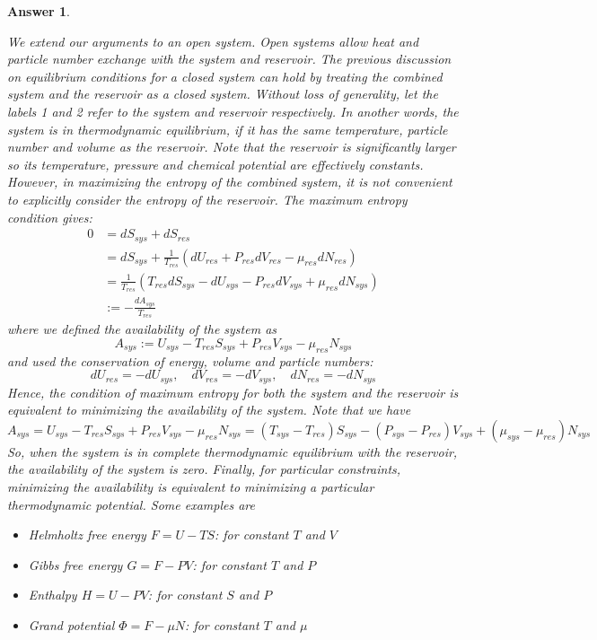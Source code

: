 \documentclass[a4paper]{article}
\newtheorem{ans}{Answer}[section]
\theoremstyle{new}
\begin{document}
\begin{ans}
\begin{itemize}
\end{itemize}
We extend our arguments to an open system. Open systems allow heat and particle number exchange with the system and reservoir. The previous discussion on equilibrium conditions for a closed system can hold by treating the combined system and the reservoir as a closed system. Without loss of generality, let the labels 1 and 2 refer to the system and reservoir respectively. In another words, the system is in thermodynamic equilibrium, if it has the same temperature, particle number and volume as the reservoir. Note that the reservoir is significantly larger so its temperature, pressure and chemical potential are effectively constants.\\[5pt]
However, in maximizing the entropy of the combined system, it is not convenient to explicitly consider the entropy of the reservoir. The maximum entropy condition gives:
\begin{align}
    0&=dS_{sys}+dS_{res}\nonumber\\&=dS_{sys}+\frac{1}{T_{res}}(dU_{res}+P_{res}dV_{res}-\mu_{res}dN_{res})\nonumber\\&=\frac{1}{T_{res}}(T_{res}dS_{sys}-dU_{sys}-P_{res}dV_{sys}+\mu_{res}dN_{sys})\nonumber\\&:=-\frac{dA_{sys}}{T_{res}}\nonumber
\end{align}
where we defined the availability of the system as
$$A_{sys}:=U_{sys}-T_{res}S_{sys}+P_{res}V_{sys}-\mu_{res}N_{sys}$$
and used the conservation of energy, volume and particle numbers:
$$dU_{res}=-dU_{sys},\quad dV_{res}=-dV_{sys},\quad dN_{res}=-dN_{sys}$$
Hence, the condition of maximum entropy for both the system and the reservoir is equivalent to minimizing the availability of the system. Note that we have
$$A_{sys}=U_{sys}-T_{res}S_{sys}+P_{res}V_{sys}-\mu_{res}N_{sys}=(T_{sys}-T_{res})S_{sys}-(P_{sys}-P_{res})V_{sys}+(\mu_{sys}-\mu_{res})N_{sys}$$
So, when the system is in complete thermodynamic equilibrium with the reservoir, the availability of the system is zero. Finally, for particular constraints, minimizing the availability is equivalent to minimizing a particular thermodynamic potential. Some examples are
\begin{itemize}
    \item Helmholtz free energy $F=U-TS$: for constant $T$ and $V$
    \item Gibbs free energy $G=F-PV$: for constant $T$ and $P$
    \item Enthalpy $H=U-PV$: for constant $S$ and $P$
    \item Grand potential $\Phi=F-\mu N$: for constant $T$ and $\mu$
\end{itemize}
\end{ans}
\end{document}
